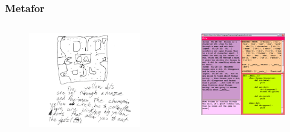 \documentclass[12pt, aspectratio=169]{beamer}
\begin{document}
\begin{frame}
\frametitle{Metafor}
\begin{columns}[c] %
\begin{figure}
\includegraphics[width=1.0\linewidth]{metafor}
\end{figure}
\begin{figure}
\includegraphics[width=1.0\linewidth]{metafor_gui}
\end{figure}
\end{columns}
\end{frame}
\end{document}
